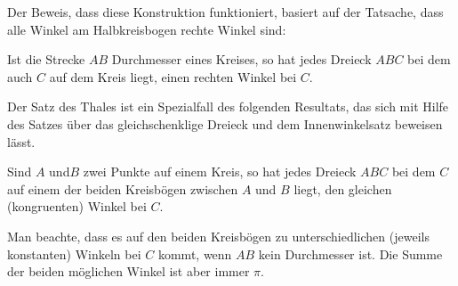 Der Beweis, dass diese Konstruktion funktioniert, basiert auf der Tatsache, dass alle Winkel am
Halbkreisbogen rechte Winkel sind:

\begin{thm}
    Ist die Strecke $AB$ Durchmesser eines Kreises, so hat jedes Dreieck $ABC$ bei dem auch $C$ auf
    dem Kreis liegt, einen rechten Winkel bei $C$.
\end{thm}

Der Satz des Thales ist ein Spezialfall des folgenden Resultats,
das sich mit Hilfe des Satzes über das gleichschenklige Dreieck %
und dem Innenwinkelsatz beweisen lässt.

\begin{thm}
    Sind $A$ und$B$ zwei Punkte auf einem Kreis, so hat jedes Dreieck $ABC$ bei dem $C$ auf einem
    der beiden Kreisbögen zwischen $A$ und $B$ liegt, den gleichen (kongruenten) Winkel bei $C$.
\end{thm}

Man beachte, dass es auf den beiden Kreisbögen zu unterschiedlichen (jeweils konstanten) Winkeln bei
$C$ kommt, wenn $AB$ kein Durchmesser ist. Die Summe der beiden möglichen Winkel ist aber immer
$\pi$.

